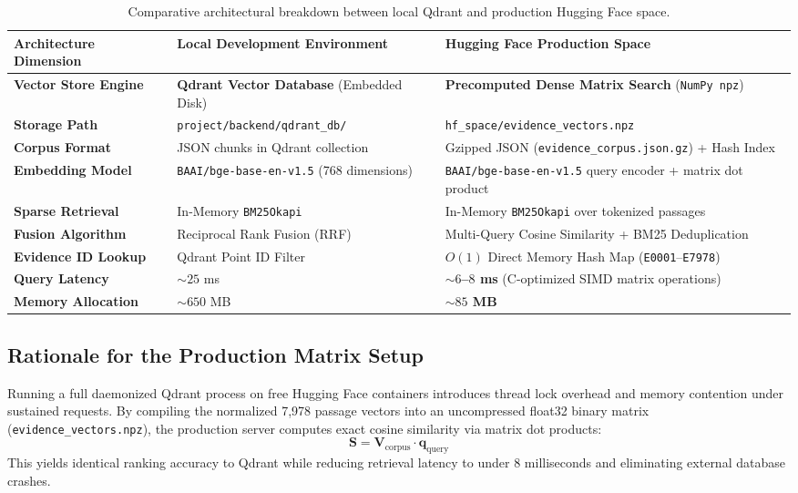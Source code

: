 \documentclass[11pt,a4paper]{article}
\begin{document}
\begin{table}[h!]
\centering
\small
\begin{tabularx}{\textwidth}{lXX}
\toprule
\textbf{Architecture Dimension} & \textbf{Local Development Environment} & \textbf{Hugging Face Production Space} \\
\midrule
\textbf{Vector Store Engine} & \textbf{Qdrant Vector Database} (Embedded Disk) & \textbf{Precomputed Dense Matrix Search} (\texttt{NumPy npz}) \\
\textbf{Storage Path} & \texttt{project/backend/qdrant\_db/} & \texttt{hf\_space/evidence\_vectors.npz} \\
\textbf{Corpus Format} & JSON chunks in Qdrant collection & Gzipped JSON (\texttt{evidence\_corpus.json.gz}) + Hash Index \\
\textbf{Embedding Model} & \texttt{BAAI/bge-base-en-v1.5} (768 dimensions) & \texttt{BAAI/bge-base-en-v1.5} query encoder + matrix dot product \\
\textbf{Sparse Retrieval} & In-Memory \texttt{BM25Okapi} & In-Memory \texttt{BM25Okapi} over tokenized passages \\
\textbf{Fusion Algorithm} & Reciprocal Rank Fusion (RRF) & Multi-Query Cosine Similarity + BM25 Deduplication \\
\textbf{Evidence ID Lookup} & Qdrant Point ID Filter & $O(1)$ Direct Memory Hash Map (\texttt{E0001}--\texttt{E7978}) \\
\textbf{Query Latency} & $\sim 25$ ms & \textbf{$\sim 6$--$8$ ms} (C-optimized SIMD matrix operations) \\
\textbf{Memory Allocation} & $\sim 650$ MB & \textbf{$\sim 85$ MB} \\
\bottomrule
\end{tabularx}
\caption{Comparative architectural breakdown between local Qdrant and production Hugging Face space.}
\end{table}

\subsection*{Rationale for the Production Matrix Setup}
Running a full daemonized Qdrant process on free Hugging Face containers introduces thread lock overhead and memory contention under sustained requests. By compiling the normalized 7,978 passage vectors into an uncompressed float32 binary matrix (\texttt{evidence\_vectors.npz}), the production server computes exact cosine similarity via matrix dot products:
\begin{equation}
    \mathbf{S} = \mathbf{V}_{\text{corpus}} \cdot \mathbf{q}_{\text{query}}
\end{equation}
This yields identical ranking accuracy to Qdrant while reducing retrieval latency to under 8 milliseconds and eliminating external database crashes.
\end{document}
